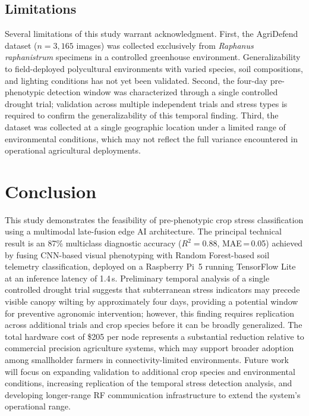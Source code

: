 \documentclass[10pt,twocolumn]{article}
\begin{document}
\subsection{Limitations}
Several limitations of this study warrant acknowledgment.
First, the AgriDefend dataset ($n = 3{,}165$ images) was collected exclusively from \textit{Raphanus raphanistrum} specimens in a controlled greenhouse environment.
Generalizability to field-deployed polycultural environments with varied species, soil compositions, and lighting conditions has not yet been validated.
Second, the four-day pre-phenotypic detection window was characterized through a single controlled drought trial; validation across multiple independent trials and stress types is required to confirm the generalizability of this temporal finding.
Third, the dataset was collected at a single geographic location under a limited range of environmental conditions, which may not reflect the full variance encountered in operational agricultural deployments.

\section{Conclusion}
This study demonstrates the feasibility of pre-phenotypic crop stress classification using a multimodal late-fusion edge AI architecture.
The principal technical result is an 87\% multiclass diagnostic accuracy ($R^2 = 0.88$, MAE\,=\,0.05) achieved by fusing CNN-based visual phenotyping with Random Forest-based soil telemetry classification, deployed on a Raspberry Pi~5 running TensorFlow Lite at an inference latency of 1.4\,s.
Preliminary temporal analysis of a single controlled drought trial suggests that subterranean stress indicators may precede visible canopy wilting by approximately four days, providing a potential window for preventive agronomic intervention; however, this finding requires replication across additional trials and crop species before it can be broadly generalized.
The total hardware cost of \$205 per node represents a substantial reduction relative to commercial precision agriculture systems, which may support broader adoption among smallholder farmers in connectivity-limited environments.
Future work will focus on expanding validation to additional crop species and environmental conditions, increasing replication of the temporal stress detection analysis, and developing longer-range RF communication infrastructure to extend the system's operational range.
\end{document}
